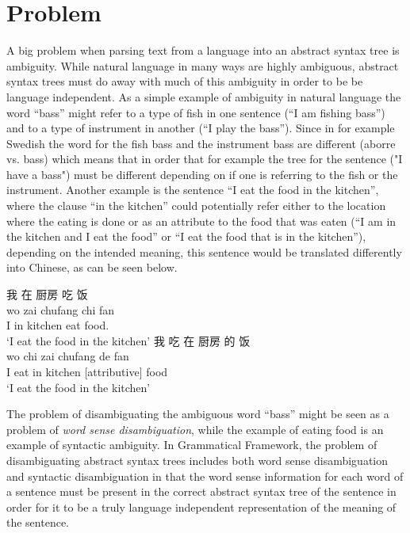 \section{Problem}
A big problem when parsing text from a language into an abstract syntax tree is ambiguity. While natural language in many ways are highly ambiguous, abstract syntax trees must do away with much of this ambiguity in order to be be language independent. As a simple example of ambiguity in natural language the word ``bass'' might refer to a type of fish in one sentence (``I am fishing bass'') and to a type of instrument in another (``I play the bass''). Since in for example Swedish the word for the fish bass and the instrument bass are different (aborre vs. bass) which means that in order that for example the tree for the sentence ("I have a bass") must be different depending on if one is referring to the fish or the instrument. Another example is the sentence ``I eat the food in the kitchen'', where the clause ``in the kitchen'' could potentially refer either to the location where the eating is done or as an attribute to the food that was eaten (``I am in the kitchen and I eat the food'' or ``I eat the food that is in the kitchen''), depending on the intended meaning, this sentence would be translated differently into Chinese, as can be seen below.

\begin{CJK*}{UTF8}{gbsn}
\begin{exe}
\label{eat_food_example}
\ex 
\glll 我 在 厨房 吃 饭\\
wo zai chufang chi fan\\
I in kitchen eat food.\\
\trans `I eat the food in the kitchen'
\ex 
\glll 我 吃 在 厨房 的 饭\\
wo chi zai chufang de fan\\
I eat in kitchen [attributive] food\\
\trans `I eat the food in the kitchen'
\end{exe}
\end{CJK*}

The problem of disambiguating the ambiguous word ``bass'' might be seen as a problem of \emph{word sense disambiguation}, while the example of eating food is an example of syntactic ambiguity. In Grammatical Framework, the problem of disambiguating abstract syntax trees includes both word sense disambiguation and syntactic disambiguation in that the word sense information for each word of a sentence must be present in the correct abstract syntax tree of the sentence in order for it to be a truly language independent representation of the meaning of the sentence.


